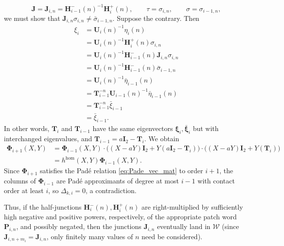 \documentclass{article}
\numberwithin{equation}{section}
\theoremstyle{definition}
\theoremstyle{remark}
\newcommand{\W}{\mathcal{W}}
\newcommand{\<}{\left\langle}
\renewcommand{\>}{\right\rangle}
\begin{document}
\begin{equation*}
  \mathbf{J} = \mathbf{J}_{i, n} = \mathbf{H}_{i-1}^-(n)^{-1} \mathbf{H}_{i}^+(n), \qquad \tau = \sigma_{i, n}, \qquad \sigma = \sigma_{i-1, n},
\end{equation*}
we must show that $\mathbf{J}_{i,n}\sigma_{i,n} \neq \bar\sigma_{i-1,n}$. Suppose the contrary. Then
\begin{equation*}
  \begin{aligned}
    \xi_i &= \mathbf{U}_i(n)^{-1} \eta_i(n) \\
    &= \mathbf{U}_i(n)^{-1} \mathbf{H}_i^+(n) \sigma_{i, n} \\
    &= \mathbf{U}_i(n)^{-1} \mathbf{H}_{i-1}^-(n) \mathbf{J}_{i,n} \sigma_{i,n} \\
    &= \mathbf{U}_i(n)^{-1} \mathbf{H}_{i-1}^-(n) \bar\sigma_{i-1,n} \\
    &= \mathbf{U}_i(n)^{-1} \bar\eta_{i-1}(n) \\
    &= \mathbf{T}_{i-1}^{-n} \mathbf{U}_{i-1}(n)^{-1} \bar\eta_{i-1}(n) \\
    &= \mathbf{T}_{i-1}^{-n} \bar\xi_{i-1} \\
    &= \bar\xi_{i-1}.
  \end{aligned}
\end{equation*}
In other words, $\mathbf{T}_i$ and $\mathbf{T}_{i-1}$ have the same eigenvectors $\boldsymbol{\xi}_i, \bar{\boldsymbol{\xi}}_i$ but with interchanged eigenvalues, and $\mathbf{T}_{i-1} = a\mathbf{I}_2 - \mathbf{T}_i$. We obtain
\begin{equation*}
  \begin{aligned}
    \boldsymbol{\Phi}_{i+1}(X,Y)
    &=\boldsymbol{\Phi}_{i-1}(X,Y)
    \cdot \bigl((X - a Y)\mathbf{I}_2 + Y (a \mathbf{I}_2 - \mathbf{T}_i)\bigr)
    \cdot \bigl((X - a Y)\mathbf{I}_2 + Y (\mathbf{T}_i)\bigr)\\
    &=h^{\hom}(X,Y)\boldsymbol{\Phi}_{i-1}(X,Y).
  \end{aligned}
\end{equation*}
Since $\boldsymbol{\Phi}_{i+1}$ satisfies the Pad\'e relation \eqref{eq:Pade_vec_mat} to order $i + 1$, the columns of $\boldsymbol{\Phi}_{i-1}$ are Pad\'e approximants of degree at most $i - 1$ with contact order at least $i$, so $\Delta_{k,i} = 0$, a contradiction.

Thus, if the half-junctions $\mathbf{H}_i^-(n), \mathbf{H}_i^+(n)$ are right-multiplied by sufficiently high negative and positive powers, respectively, of the appropriate patch word $\mathbf{P}_{i,n}$, and possibly negated, then the junctions $\mathbf{J}_{i,n}$ eventually land in $\W$ (since $\mathbf{J}_{i, n+m_i} = \mathbf{J}_{i,n}$, only finitely many values of $n$ need be considered).
\end{document}
